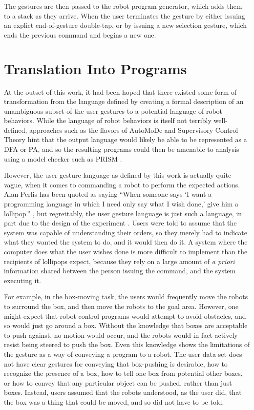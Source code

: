 The gestures are then passed to the robot program generator, which adds them to a stack as they arrive. 
When the user terminates the gesture by either issuing an explict end-of-gesture double-tap, or by issuing a new selection gesture, which ends the previous command and begins a new one. 

\section{Translation Into Programs}
At the outset of this work, it had been hoped that there existed some form of transformation from the language defined by creating a formal description of an unambiguous subset of the user gestures to a potential language of robot behaviors. 
While the language of robot behaviors is itself not terribly well-defined, approaches such as the flavors of AutoMoDe and Supervisory Control Theory hint that the output language would likely be able to be represented as a DFA or PA, and so the resulting programs could then be amenable to analysis using a model checker such as PRISM \citep{KNP11}.

However, the user gesture language as defined by this work is actually quite vague, when it comes to commanding a robot to perform the expected actions. 
Alan Perlis has been quoted as saying ``When someone says `I want a programming language in which I need only say what I wish done,' give him a lollipop.'' , but regrettably, the user gesture language is just such a language, in part due to the design of the experiment \citep{PerlisYaleLolz}.  
Users were told to assume that the system was capable of understanding their orders, so they merely had to indicate what they wanted the system to do, and it would then do it. 
A system where the computer does what the user wishes done is more difficult to implement than the recipients of lollipops expect, because they rely on a large amount of \emph{a priori} information shared between the person issuing the command, and the system executing it. 

For example, in the box-moving task, the users would frequently move the robots to surround the box, and then move the robots to the goal area. 
However, one might expect that robot control programs would attempt to avoid obstacles, and so would just go around a box. 
Without the knowledge that boxes are acceptable to push against, no motion would occur, and the robots would in fact actively resist being steered to push the box. 
Even this knowledge shows the limitations of the gesture as a way of conveying a program to a robot.
The user data set does not have clear gestures for conveying that box-pushing is desirable, how to recognize the presence of a box, how to tell one box from potential other boxes, or how to convey that any particular object can be pushed, rather than just boxes. 
Instead, users assumed that the robots understood, as the user did, that the box was a thing that could be moved, and so did not have to be told.

